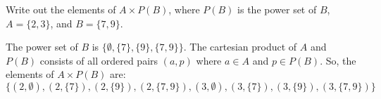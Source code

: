 \documentclass{article}
\begin{document}
Write out the elements of $A \times P(B)$, where $P(B)$ is the power set of $B$, $A=\{2,3\}$, and $B=\{7,9\}$.

The power set of $B$ is $\{ \emptyset, \{7\}, \{9\}, \{7,9\} \}$.
The cartesian product of $A$ and $P(B)$ consists of all ordered pairs $(a, p)$ where $a \in A$ and $p \in P(B)$. 
So, the elements of $A \times P(B)$ are: $\{ (2, \emptyset), (2, \{7\}), (2, \{9\}), (2, \{7,9\}), (3, \emptyset), (3, \{7\}), (3, \{9\}), (3, \{7,9\}) \}$
\end{document}
